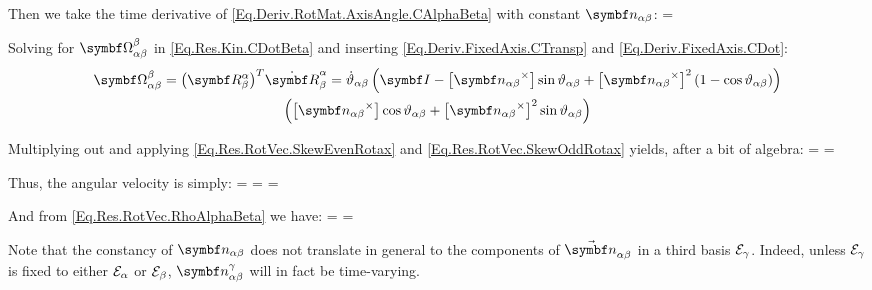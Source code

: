 Then we take the time derivative of \eqref{Eq.Deriv.RotMat.AxisAngle.CAlphaBeta} with constant $\vrel{\rotax}{\alpha}{\beta}$:
{
\RotMDot{\alpha}{\beta} = \rel{\dot{\rotang}}{\alpha}{\beta} \rndp{\vskew{\vrel{\rotax}{\alpha}{\beta}} \cos \rel{\rotang}{\alpha}{\beta} + {\vskew{\vrel{\rotax}{\alpha}{\beta}}}^2 \sin \rel{\rotang}{\alpha}{\beta}}
}

Solving for $\AngVelSkew{\alpha}{\beta}{\beta}$ in \eqref{Eq.Res.Kin.CDotBeta} and inserting \eqref{Eq.Deriv.FixedAxis.CTransp} and \eqref{Eq.Deriv.FixedAxis.CDot}:
\begin{multline*}
\AngVelSkew{\alpha}{\beta}{\beta} = \trp{\RotM{\alpha}{\beta}} \RotMDot{\alpha}{\beta}
=	\rel{\dot{\rotang}}{\alpha}{\beta} \rndp{\IdM - \vskew{\vrel{\rotax}{\alpha}{\beta}} \sin \rel{\rotang}{\alpha}{\beta} + \vskew{\vrel{\rotax}{\alpha}{\beta}}^2 (1-\cos \rel{\rotang}{\alpha}{\beta})}\\
	\rndp{\vskew{\vrel{\rotax}{\alpha}{\beta}} \cos \rel{\rotang}{\alpha}{\beta} + {\vskew{\vrel{\rotax}{\alpha}{\beta}}}^2 \sin \rel{\rotang}{\alpha}{\beta}}
\end{multline*}

Multiplying out and applying \eqref{Eq.Res.RotVec.SkewEvenRotax} and \eqref{Eq.Res.RotVec.SkewOddRotax} yields, after a bit of algebra:
\eqnl
{
\AngVelSkew{\alpha}{\beta}{\beta} = \rel{\dot{\rotang}}{\alpha}{\beta} \rndp{\vskew{\vrel{\rotax}{\alpha}{\beta}} \cos^2 \rel{\rotang}{\alpha}{\beta} + \vskew{\vrel{\rotax}{\alpha}{\beta}} \sin^2 \rel{\rotang}{\alpha}{\beta}} = \rel{\dot{\rotang}}{\alpha}{\beta} \vskew{\vrel{\rotax}{\alpha}{\beta}}
}

Thus, the angular velocity is simply:
{
\angvel{\alpha}{\beta}{\beta} = \angvel{\alpha}{\beta}{\alpha} =\angvel{\alpha}{\beta}{} = \rel{\dot{\rotang}}{\alpha}{\beta} \vrel{\rotax}{\alpha}{\beta}
}

And from \eqref{Eq.Res.RotVec.RhoAlphaBeta} we have:
{
\rotvdot{\alpha}{\beta}{} = \rel{\dot{\rotang}}{\alpha}{\beta} \vrel{\rotax}{\alpha}{\beta} = \angvel{\alpha}{\beta}{}
}

Note that the constancy of $\vrel{\rotax}{\alpha}{\beta}$ does not translate in general to the components of $\varel{\rotax}{\alpha}{\beta}$ in a third basis $\basis[\gamma]$. Indeed, unless $\basis[\gamma]$ is fixed to either $\basis[\alpha]$ or $\basis[\beta]$, $\vrelprj{\rotax}{\alpha}{\beta}{\gamma}$ will in fact be time-varying.

